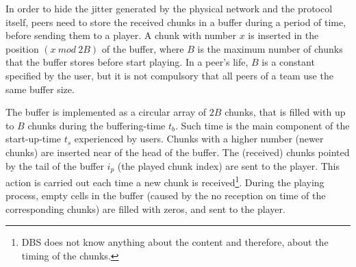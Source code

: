 

\label{sec:buffering_chunks}

In order to hide the jitter generated by the physical network and the
protocol itself, peers need to store the received chunks in a buffer
during a period of time, before sending them to a player. A chunk with
number $x$ is inserted in the position $(x~\mathit{mod}~2B)$ of the
buffer, where $B$ is the maximum number of chunks that the buffer
stores before start playing. In a peer's life, $B$ is a constant
specified by the user, but it is not compulsory that all peers of a
team use the same buffer size.

The buffer is implemented as a circular array of $2B$ chunks, that is
filled with up to $B$ chunks during the \gls{buffering-time} $t_b$.
Such time is the main component of the \gls{start-up-time} $t_s$
experienced by users. Chunks with a higher number (newer chunks) are
inserted near of the head of the buffer. The (received) chunks pointed
by the tail of the buffer $i_p$ (the played chunk index) are sent to
the player. This action is carried out each time a new chunk is
received\footnote{DBS does not know anything about the content and
  therefore, about the timing of the chunks.}. During the playing
process, empty cells in the buffer (caused by the no reception on time
of the corresponding chunks) are filled with zeros, and sent to the
player.

